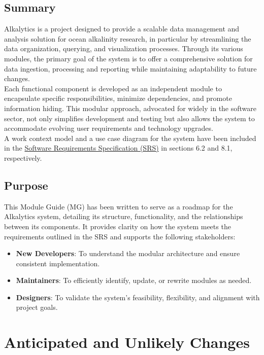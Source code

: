 \documentclass[12pt, titlepage]{article}
\begin{document}
\subsection{Summary}
Alkalytics is a project designed to provide a scalable data management and analysis
solution for ocean alkalinity research, in particular by streamlining the data 
organization, querying, and visualization processes. Through its various modules, 
the primary goal of the system is to offer a comprehensive solution for data 
ingestion, processing and reporting  while maintaining adaptability to future 
changes.\\
\newline
Each functional component is developed as an independent module to encapsulate 
specific responsibilities, minimize dependencies, and promote information
hiding. This modular approach, advocated for widely in the software sector, not only
simplifies development and testing but also allows the system to accommodate evolving
user requirements and technology upgrades.\\
\newline
A work context model and a use case diagram for the system have been included in the 
\href{https://github.com/SumanyaG/Alkalytics/blob/main/docs/SRS/SRS.pdf}{Software Requirements Specification (SRS)} 
in sections 6.2 and 8.1, respectively.

\subsection{Purpose}
This Module Guide (MG) has been written to serve as a roadmap for the Alkalytics system,
detailing its structure, functionality, and the relationships between its components.
It provides clarity on how the system meets the requirements outlined in the SRS
and supports the following stakeholders:
\begin{itemize}
  \item \textbf{New Developers}: To understand the modular architecture and ensure
  consistent implementation.
  \item \textbf{Maintainers}: To efficiently identify, update, or rewrite modules as needed.
  \item \textbf{Designers}: To validate the system's feasibility, flexibility, and alignment
  with project goals. 
\end{itemize}

\section{Anticipated and Unlikely Changes} \label{SecChange}
\end{document}
